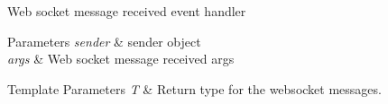 Web socket message received event handler 


\begin{DoxyParams}{Parameters}
{\em sender} & sender object\\
\hline
{\em args} & Web socket message received args\\
\hline
\end{DoxyParams}

\begin{DoxyTemplParams}{Template Parameters}
{\em T} & Return type for the websocket messages.\\
\hline
\end{DoxyTemplParams}
